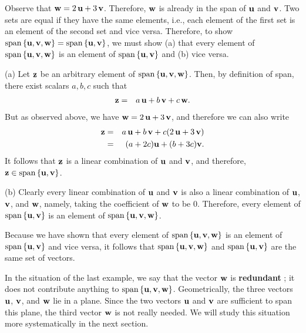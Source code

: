 \begin{solution}
  Observe that $\mbox{\bf w} = 2\,\mbox{\bf u}+3\,\mbox{\bf v}$. Therefore,
  $\mbox{\bf w}$ is already in the span of $\mbox{\bf u}$ and $\mbox{\bf v}$.  Two
  sets are equal if they have the same elements, i.e., each element of
  the first set is an element of the second set and vice
  versa. Therefore, to show
  $\sspan\set{\vect{u},\vect{v},\vect{w}} =
  \sspan\set{\vect{u},\vect{v}}$, we must show (a) that every element
  of $\sspan\set{\vect{u},\vect{v},\vect{w}}$ is an element of
  $\sspan\set{\vect{u},\vect{v}}$ and (b) vice versa.

  (a) Let $\mbox{\bf z}$ be an arbitrary element of
  $\sspan\set{\vect{u},\vect{v},\vect{w}}$. Then, by definition of
  span, there exist scalars $a,b,c$ such that
  \begin{eqnarray*}
    \mbox{\bf z} &=& a\,\mbox{\bf u} + b\,\mbox{\bf v} + c\,\mbox{\bf w}.
  \end{eqnarray*}
  But as observed above, we have $\mbox{\bf w} = 2\,\mbox{\bf u}+3\,\mbox{\bf v}$,
  and therefore we can also write
  \begin{eqnarray*}
    \mbox{\bf z}
    &=& a\,\mbox{\bf u} + b\,\mbox{\bf v} + c(2\,\mbox{\bf u}+3\,\mbox{\bf v})\\
    &=& (a+2c)\mbox{\bf u} + (b+3c)\mbox{\bf v}.
  \end{eqnarray*}
  It follows that $\mbox{\bf z}$ is a linear combination of $\mbox{\bf u}$ and
  $\mbox{\bf v}$, and therefore, $\vect{z}\in \sspan\set{\vect{u},\vect{v}}$.

  (b) Clearly every linear combination of $\mbox{\bf u}$ and $\mbox{\bf v}$ is
  also a linear combination of $\mbox{\bf u}$, $\mbox{\bf v}$, and $\mbox{\bf w}$,
  namely, taking the coefficient of $\mbox{\bf w}$ to be $0$. Therefore,
  every element of $\sspan\set{\vect{u},\vect{v}}$ is an element of
  $\sspan\set{\vect{u},\vect{v},\vect{w}}$.

  Because we have shown that every element of
  $\sspan\set{\vect{u},\vect{v},\vect{w}}$ is an element of
  $\sspan\set{\vect{u},\vect{v}}$ and vice versa, it follows that
  $\sspan\set{\vect{u},\vect{v},\vect{w}}$ and
  $\sspan\set{\vect{u},\vect{v}}$ are the same set of vectors.
\end{solution}

In the situation of the last example, we say that the vector
$\mbox{\bf w}$ is \textbf{redundant}%
; it does not
contribute anything to
$\sspan\set{\vect{u},\vect{v},\vect{w}}$. Geometrically, the three
vectors $\mbox{\bf u}$, $\mbox{\bf v}$, and $\mbox{\bf w}$ lie in a plane. Since
the two vectors $\mbox{\bf u}$ and $\mbox{\bf v}$ are sufficient to span this
plane, the third vector $\mbox{\bf w}$ is not really needed. We will study
this situation more systematically in the next section.

